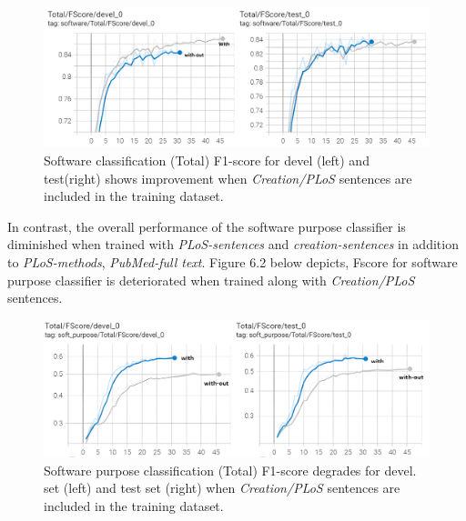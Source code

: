 \begin{figure}[htbp]
	\centering
	\includegraphics[width=.86\textwidth]{4.graphics/figures/ch_6/1.with_sent_vs_without/HD/TotalFscoresoftware}
	\caption{Software classification (Total) F1-score for devel (left) and test(right) shows improvement when \emph{Creation/PLoS} sentences are included in the training dataset.}
	\label{fig:chapter06:with}
\end{figure}


In contrast, the overall performance of the software purpose classifier is diminished when trained with \emph{ PLoS-sentences} and \emph{creation-sentences} in addition to \emph{ PLoS-methods}, \emph{PubMed-full text}. Figure 6.2 below depicts, Fscore for software purpose classifier is deteriorated when trained along with \emph{Creation/PLoS} sentences.  \\

\begin{figure}[htbp]
	\centering
	\includegraphics[width=.86\textwidth]{4.graphics/figures/ch_6/1.with_sent_vs_without/HD/Total_Fscore_software_purpose}
	\caption{Software purpose classification (Total) F1-score degrades for devel. set (left) and test set (right) when \emph{Creation/PLoS} sentences are included in the training dataset.}
	\label{fig:chapter06:with}
\end{figure}


